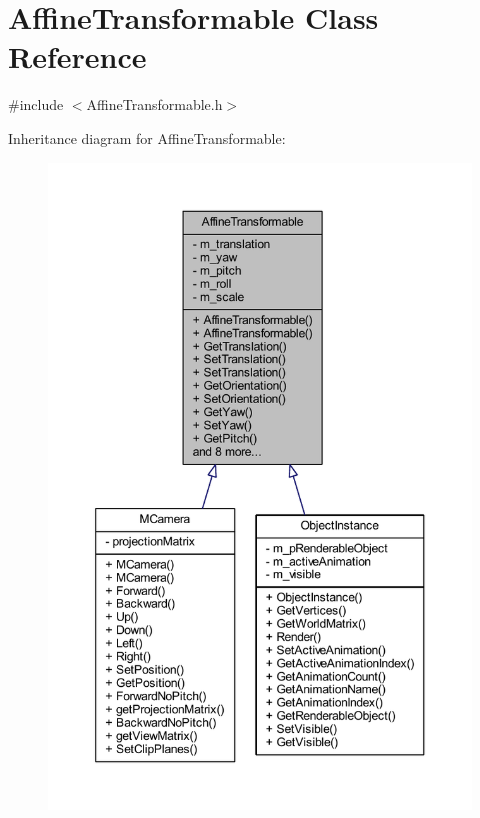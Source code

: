 \hypertarget{class_affine_transformable}{}\section{Affine\+Transformable Class Reference}
\label{class_affine_transformable}


{\ttfamily \#include $<$Affine\+Transformable.\+h$>$}



Inheritance diagram for Affine\+Transformable\+:\nopagebreak
\begin{figure}[H]
\begin{center}
\leavevmode
\includegraphics[width=350pt]{class_affine_transformable__inherit__graph}
\end{center}
\end{figure}


